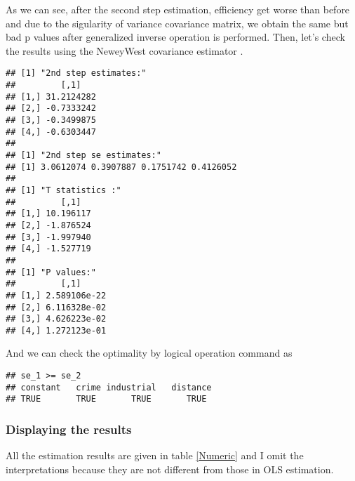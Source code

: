 \documentclass[
  12pt,
]{article}
\begin{document}
As we can see, after the second step estimation, efficiency get worse than before and due to the sigularity of variance covariance matrix, we obtain the same but bad p values after generalized inverse operation is performed. Then, let's check the results using \color{blue} the NeweyWest covariance estimator \color{black}.

\begin{verbatim}
## [1] "2nd step estimates:"
##         [,1]
## [1,] 31.2124282
## [2,] -0.7333242
## [3,] -0.3499875
## [4,] -0.6303447
## 
## [1] "2nd step se estimates:"
## [1] 3.0612074 0.3907887 0.1751742 0.4126052
## 
## [1] "T statistics :"
##         [,1]
## [1,] 10.196117
## [2,] -1.876524
## [3,] -1.997940
## [4,] -1.527719
##
## [1] "P values:"
##         [,1]
## [1,] 2.589106e-22
## [2,] 6.116328e-02
## [3,] 4.626223e-02
## [4,] 1.272123e-01
\end{verbatim}

And we can check the optimality by logical operation command as

\begin{verbatim}
## se_1 >= se_2
## constant   crime industrial   distance 
## TRUE       TRUE       TRUE       TRUE 
\end{verbatim}

\hypertarget{displaying-the-results}{%
\subsubsection{Displaying the results}\label{displaying-the-results}}

All the estimation results are given in table \ref{Numeric} and I omit the interpretations because they are not different from those in OLS estimation.
\end{document}
